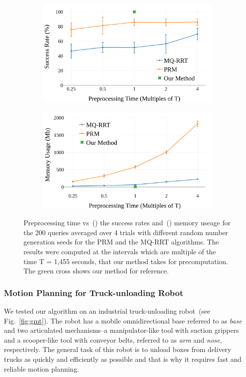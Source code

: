 \documentclass[a4paper,10pt]{article}
\begin{document}
\begin{figure}
\begin{subfigure}{0.5\textwidth}
\centering
  \includegraphics[width=0.9\linewidth]{success.png}
  \caption{}
  \label{fig:success}
\end{subfigure}
\hfill
\begin{subfigure}{0.5\textwidth}
\centering
  \includegraphics[width=0.9\linewidth]{memory.png}
  \caption{}
  \label{fig:memory}
\end{subfigure}
    \caption{Preprocessing time vs~() the success rates and~() memory useage for the 200 queries averaged over 4 trials with different random number generation seeds for the PRM and the MQ-RRT algorithms. The results were computed at the intervals which are multiple of the time T = 1,455 seconds, that our method takes for precomputation. The green cross shows our method for reference.}
    \label{fig:plots}
\end{figure}

\subsubsection{Motion Planning for Truck-unloading Robot}
We tested our algorithm on an industrial truck-unloading robot~(see Fig.~\ref{fig:gmt}). The robot has a mobile omnidirectional base referred to as \textit{base} and two articulated mechanisms--a manipulator-like tool with suction grippers and a  scooper-like tool with conveyor belts, referred to as \textit{arm} and \textit{nose}, respectively. The general task of this robot is to unload boxes from delivery trucks as quickly and efficiently as possible and that is why it requires fast and reliable motion planning.
\end{document}
